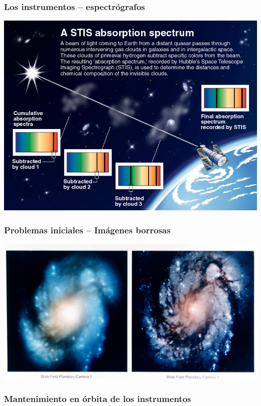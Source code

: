 \documentclass{beamer}
\begin{document}
\begin{frame}
  \frametitle{Los instrumentos -- espectrógrafos}
  \includegraphics{STIS-absorption-spectrum}
\end{frame}

\begin{frame}
  \frametitle{Problemas iniciales -- Imágenes borrosas}
  \includegraphics{1280px-Hubble_Images_of_M100_Before_and_After_Mirror_Repair_-_GPN-2002-000064}
\end{frame}

\begin{frame}
  \frametitle{Mantenimiento en órbita de los instrumentos}
\end{frame}
\end{document}
